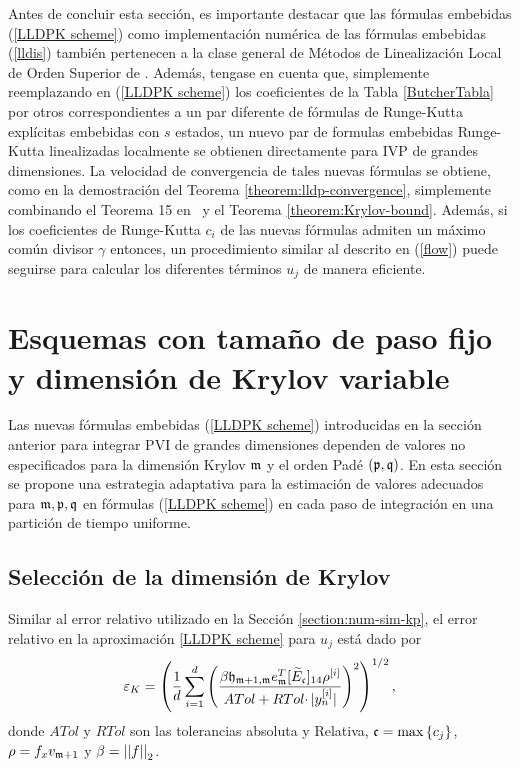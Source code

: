 Antes de concluir esta sección, es importante destacar que las fórmulas embebidas (\ref{LLDPK scheme}) como implementación numérica de las fórmulas embebidas (\ref{lldis}) también pertenecen a la clase general de Métodos de Linealización Local de Orden Superior de \cite{Jimenez13}. Además, tengase en cuenta que, simplemente reemplazando en (\ref{LLDPK scheme}) los coeficientes de la Tabla \ref{ButcherTabla} por otros correspondientes a un par diferente de fórmulas de Runge-Kutta explícitas embebidas con $s$ estados, un nuevo par de formulas embebidas Runge-Kutta linealizadas localmente se obtienen directamente para IVP de grandes dimensiones. La velocidad de convergencia de tales nuevas fórmulas se obtiene, como en la demostración del Teorema \ref{theorem:lldp-convergence}, simplemente combinando el Teorema 15 en~\cite{Jimenez13} y el Teorema \ref{theorem:Krylov-bound}. Además, si los coeficientes de Runge-Kutta $c_i$ de las nuevas fórmulas admiten un máximo común divisor $\gamma$ entonces, un procedimiento similar al descrito en (\ref{flow}) puede seguirse para calcular los diferentes términos $u_j$ de manera eficiente.

\section{Esquemas con tamaño de paso fijo y dimensión de Krylov variable}\label{section:lldp-fix-step}

Las nuevas fórmulas embebidas (\ref{LLDPK scheme}) introducidas en la sección anterior para integrar PVI de grandes dimensiones
dependen de valores no especificados para la dimensión Krylov $\mathfrak{m}$ y el orden Padé $(\mathfrak{p} ,\mathfrak{q})$. En esta sección se propone una estrategia adaptativa para la estimación de valores adecuados para $\mathfrak{m}, \mathfrak{p} ,\mathfrak{q}$ en fórmulas (\ref{LLDPK scheme}) en cada paso de integración en una partición de tiempo uniforme.

\subsection{Selección de la dimensión de Krylov}\label{sec:selkrydim}

Similar al error relativo utilizado en la Sección \ref{section:num-sim-kp}, el error relativo en la aproximación \ref{LLDPK scheme} para $u_j$ está dado por
\begin{equation}
    \varepsilon_{K} = \left(\frac{1}{d}\sum\limits_{i=1}^{d} \left(\frac{\beta
        \mathfrak{h}_{\mathfrak{m}+1,\mathfrak{m}} e_{\mathfrak{m}}^T
        [\widetilde{E}_\mathfrak{c}]_{14} \rho^{[i]}}{ATol+ RTol\cdotp
        \rvert y_{n}^{[i]}\rvert}\right)^{2}\right)^{1/2},
    \label{errrel}
\end{equation}
donde $ATol$ y $RTol$ son las tolerancias absoluta y Relativa, $\mathfrak{c}=\max\left\{ c_j \right\}$, $\rho = f_x v_{\mathfrak{m}+1}$ y $\beta=\left\lvert \left\lvert f \right\rvert \right\rvert_2$.

